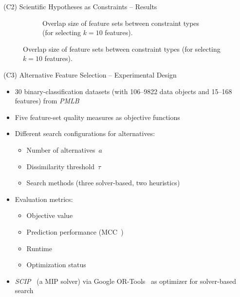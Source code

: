 \documentclass[en, navbarinline, handout]{sdqbeamer}
\begin{document}
\begin{frame}[t]{(C2) Scientific Hypotheses as Constraints -- Results}
\begin{figure}
\begin{subfigure}{0.48\textwidth}
			\caption*{Overlap size of feature sets between constraint types (for selecting $k=10$ features).}
		\end{subfigure}
	\end{figure}
\end{frame}

\begin{frame}[t]{(C3) Alternative Feature Selection -- Experimental Design}
	\begin{itemize}
		\item 30 binary-classification datasets (with 106--9822 data objects and 15--168 features) from \emph{PMLB}~\cite{olson2017pmlb, romano2021pmlb}
		\item Five feature-set quality measures as objective functions
		\item Different search configurations for alternatives:
		\begin{itemize}
			\item Number of alternatives~$a$
			\item Dissimilarity threshold~$\tau$
			\item Search methods (three solver-based, two heuristics)
		\end{itemize}
		\item Evaluation metrics:
		\begin{itemize}
			\item Objective value
			\item Prediction performance (MCC~\cite{matthews1975comparison})
			\item Runtime
			\item Optimization status
		\end{itemize}
		\item \emph{SCIP}~\cite{bestuzheva2021scip} (a MIP solver) via {Google OR-Tools}~\cite{perron2022or-tools} as optimizer for solver-based search
	\end{itemize}
\end{frame}
\end{document}
